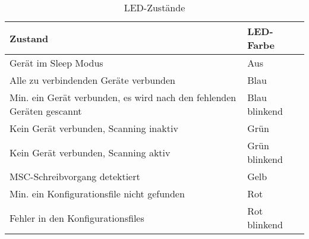 \begin{table}[H]
	\centering
	\begin{tabular}[H]{l|l}
		Zustand & LED-Farbe \\
		\hline
		Gerät im Sleep Modus & Aus \\
		\hline
		Alle zu verbindenden Geräte verbunden & Blau \\
		\hline
		Min. ein Gerät verbunden, es wird nach den fehlenden Geräten gescannt & Blau blinkend \\
		\hline
		Kein Gerät verbunden, Scanning inaktiv & Grün \\
		\hline
		Kein Gerät verbunden, Scanning aktiv & Grün blinkend \\
		\hline
		MSC-Schreibvorgang detektiert & Gelb \\
		\hline
		Min. ein Konfigurationsfile nicht gefunden & Rot \\
		\hline
		Fehler in den Konfigurationsfiles & Rot blinkend \\
	\end{tabular}
	\caption{LED-Zustände}
\end{table}